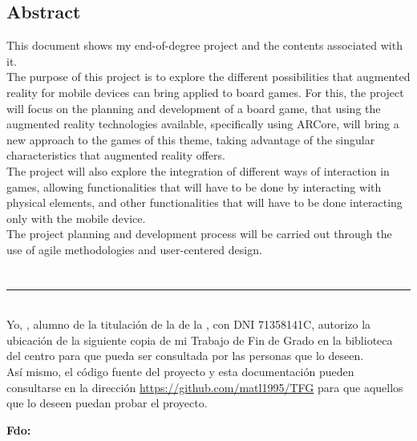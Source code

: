 {{\section*{Abstract}
This document shows my end-of-degree project and the contents associated with it.\\

The purpose of this project is to explore the different possibilities that augmented reality for mobile devices can bring applied to board games. For this, the project will focus on the planning and development of a board game, that using the augmented reality technologies available, specifically using ARCore, will bring a new approach to the games of this theme, taking advantage of the singular characteristics that augmented reality offers.\\

The project will also explore the integration of different ways of interaction in games, allowing functionalities that will have to be done by interacting with physical elements, and other functionalities that will have to be done interacting only with the mobile device.\\

The project planning and development process will be carried out through the use of agile methodologies and user-centered design.

\chapter*{}
\thispagestyle{empty}

\noindent\rule[-1ex]{\textwidth}{2pt}\\[4.5ex]

Yo, \textbf{\autor}, alumno de la titulación \textbf{\grado} de la \textbf{\escuela} de la \textbf{\universidad}, con DNI 71358141C, autorizo la ubicación de la siguiente copia de mi Trabajo de Fin de Grado en la biblioteca del centro para que pueda ser consultada por las personas que lo deseen.\\

Así mismo, el código fuente del proyecto y esta documentación pueden consultarse en la dirección \url{https://github.com/matl1995/TFG} para que aquellos que lo deseen puedan probar el proyecto.

\vspace{5cm}

\noindent \textbf{Fdo: \autor}

\vspace{2cm}

}}
